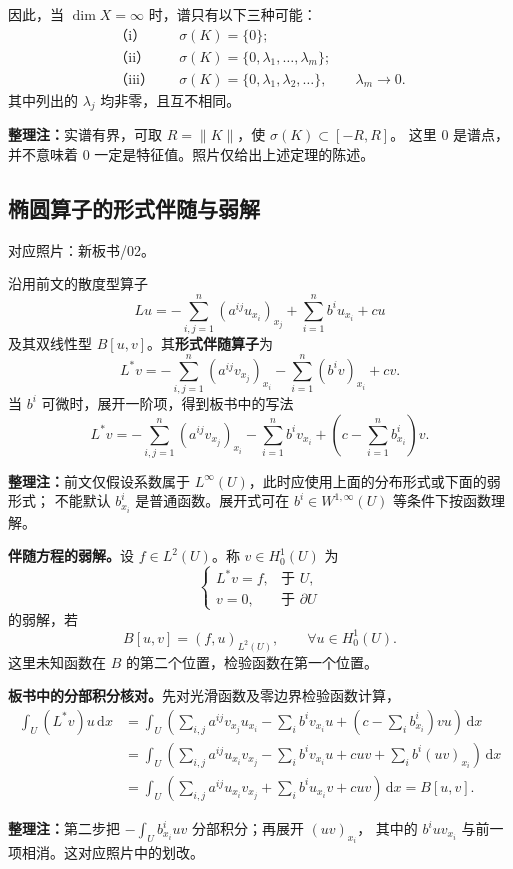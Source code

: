 \documentclass[UTF8,a4paper,11pt,fontset=fandol]{ctexart}
\newcommand{\dd}{\,\mathrm d}
\newcommand{\ednote}[1]{\par{\small\color{notegray}\textbf{整理注：}#1}\par}
\newcommand{\source}[1]{{\small\color{notegray}对应照片：#1。}\par}
\begin{document}
因此，当 $\dim X=\infty$ 时，谱只有以下三种可能：
\[
\begin{aligned}
\text{（i）}\quad &\sigma(K)=\{0\};\\
\text{（ii）}\quad &\sigma(K)=\{0,\lambda_1,\ldots,\lambda_m\};\\
\text{（iii）}\quad &\sigma(K)=\{0,\lambda_1,\lambda_2,\ldots\},
\qquad\lambda_m\longrightarrow0.
\end{aligned}
\]
其中列出的 $\lambda_j$ 均非零，且互不相同。
\begin{center}
\end{center}
\ednote{实谱有界，可取 $R=\|K\|$，使 $\sigma(K)\subset[-R,R]$。
这里 $0$ 是谱点，并不意味着 $0$ 一定是特征值。照片仅给出上述定理的陈述。}

\newpage
\subsection{椭圆算子的形式伴随与弱解}
\source{新板书/02}
沿用前文的散度型算子
\[
Lu=-\sum_{i,j=1}^n(a^{ij}u_{x_i})_{x_j}
   +\sum_{i=1}^nb^iu_{x_i}+cu
\]
及其双线性型 $B[u,v]$。其\textbf{形式伴随算子}为
\[
\boxed{L^*v=-\sum_{i,j=1}^n(a^{ij}v_{x_j})_{x_i}
            -\sum_{i=1}^n(b^iv)_{x_i}+cv.}
\]
当 $b^i$ 可微时，展开一阶项，得到板书中的写法
\[
L^*v=-\sum_{i,j=1}^n(a^{ij}v_{x_j})_{x_i}
     -\sum_{i=1}^nb^iv_{x_i}
     +\left(c-\sum_{i=1}^n b^i_{x_i}\right)v.
\]
\ednote{前文仅假设系数属于 $L^\infty(U)$，此时应使用上面的分布形式或下面的弱形式；
不能默认 $b^i_{x_i}$ 是普通函数。展开式可在 $b^i\in W^{1,\infty}(U)$ 等条件下按函数理解。}

\textbf{伴随方程的弱解。}设 $f\in L^2(U)$。称 $v\in H_0^1(U)$ 为
\[
\begin{cases}
L^*v=f,&\text{于 }U,\\
v=0,&\text{于 }\partial U
\end{cases}
\]
的弱解，若
\[
\boxed{B[u,v]=(f,u)_{L^2(U)},\qquad\forall u\in H_0^1(U).}
\]
这里未知函数在 $B$ 的第二个位置，检验函数在第一个位置。

\textbf{板书中的分部积分核对。}先对光滑函数及零边界检验函数计算，
\[
\begin{aligned}
\int_U(L^*v)u\dd x
&=\int_U\left(\sum_{i,j}a^{ij}v_{x_j}u_{x_i}
 -\sum_i b^iv_{x_i}u
 +\left(c-\sum_i b^i_{x_i}\right)vu\right)\dd x\\
&=\int_U\left(\sum_{i,j}a^{ij}u_{x_i}v_{x_j}
 -\sum_i b^iv_{x_i}u+cuv+\sum_i b^i(uv)_{x_i}\right)\dd x\\
&=\int_U\left(\sum_{i,j}a^{ij}u_{x_i}v_{x_j}
 +\sum_i b^iu_{x_i}v+cuv\right)\dd x
=B[u,v].
\end{aligned}
\]
\ednote{第二步把 $-\int_U b^i_{x_i}uv$ 分部积分；再展开 $(uv)_{x_i}$，
其中的 $b^iuv_{x_i}$ 与前一项相消。这对应照片中的划改。}
\end{document}

